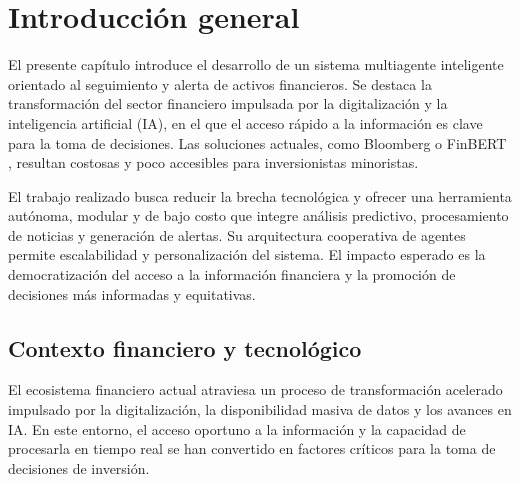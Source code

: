 

  \chapter{Introducción general}

  \label{Chapter1}
  \label{IntroGeneral}

  El presente capítulo introduce el desarrollo de un sistema multiagente inteligente
  orientado al seguimiento y alerta de activos financieros. Se destaca la
  transformación del sector financiero impulsada por la digitalización y la
  inteligencia artificial (IA), en el que el acceso rápido a la información es clave
  para la toma de decisiones. Las soluciones actuales, como Bloomberg
  \parencite{gratton2024bloomberg,king2016terminal} o FinBERT
  \parencite{araci2019finbert,liu2020finbert,huang2021finbert}, resultan costosas y
  poco accesibles para inversionistas minoristas.

  El trabajo realizado busca reducir la brecha tecnológica y ofrecer una herramienta
  autónoma, modular y de bajo costo que integre análisis predictivo, procesamiento de
  noticias y generación de alertas. Su arquitectura cooperativa de agentes permite
  escalabilidad y personalización del sistema. El impacto esperado es la
  democratización del acceso a la información financiera y la promoción de decisiones
  más informadas y equitativas.


  \newcommand{\keyword}[1]{\textbf{#1}}
  \newcommand{\tabhead}[1]{\textbf{#1}}
  \newcommand{\code}[1]{\texttt{#1}}
  \newcommand{\file}[1]{\texttt{\bfseries#1}}
  \newcommand{\option}[1]{\texttt{\itshape#1}}
  \newcommand{\grados}{$^{\circ}$}


  \section{Contexto financiero y tecnológico}

  El ecosistema financiero actual atraviesa un proceso de transformación acelerado
  impulsado por la digitalización, la disponibilidad masiva de datos y los avances en
  IA. En este entorno, el acceso oportuno a la información y la capacidad de
  procesarla en tiempo real se han convertido en factores críticos para la toma de
  decisiones de inversión.

